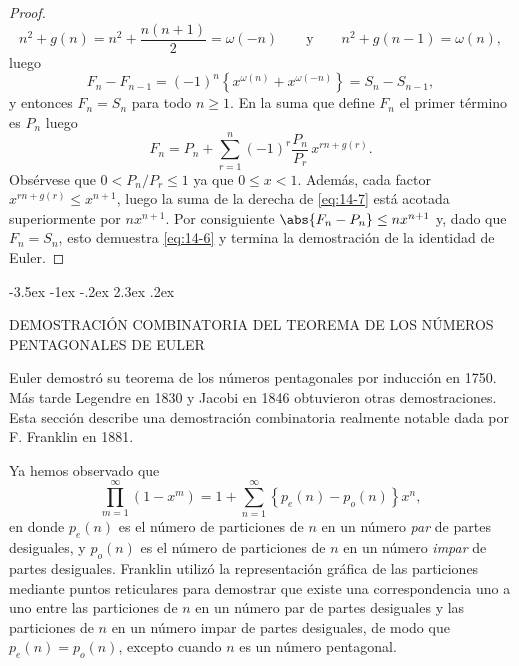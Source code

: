 \documentclass[12pt,a4paper]{book}
\makeatletter
\renewcommand\section{\@startsection{section}{1}{\z@}%
  {-3.5ex \@plus -1ex \@minus -.2ex}%
  {2.3ex \@plus .2ex}%
  {\normalfont\Large\bfseries\raggedright}}
\makeatother
\begin{document}
\begin{proof}
\begin{equation*}
            n^{2}+g(n)=n^{2}+\frac{n(n+1)}{2}=\omega(-n)\qquad\text{y}\qquad n^{2}+g(n-1)=\omega(n),
        \end{equation*}
        luego
        \begin{equation*}
            F_{n}-F_{n-1}=(-1)^{n}\left\{x^{\omega(n)}+x^{\omega(-n)}\right\}=S_{n}-S_{n-1},
        \end{equation*}
        y entonces $F_{n}=S_{n}$ para todo $n\geq1$. En la suma que define $F_{n}$ el primer término
        es $P_{n}$ luego
        \begin{equation}\label{eq:14-7}
            F_{n}=P_{n}+\sum_{r=1}^{n}(-1)^{r}\frac{P_{n}}{P_{r}}\,x^{rn+g(r)}.
        \end{equation}
        Obsérvese que $0<P_{n}/P_{r}\leq1$ ya que $0\leq x<1$. Además, cada factor
        $x^{rn+g(r)}\leq x^{n+1}$, luego la suma de la derecha de \eqref{eq:14-7} está acotada
        superiormente por $nx^{n+1}$. Por consiguiente $\abs{F_{n}-P_{n}}\leq nx^{n+1}$ y, dado que
        $F_{n}=S_{n}$, esto demuestra \eqref{eq:14-6} y termina la demostración de la identidad de
        Euler.
    \end{proof}

    \section{DEMOSTRACIÓN COMBINATORIA DEL TEOREMA DE LOS NÚMEROS PENTAGONALES DE EULER}

    Euler demostró su teorema de los números pentagonales por inducción en 1750. Más tarde
    Legendre en 1830 y Jacobi en 1846 obtuvieron otras demostraciones. Esta sección describe
    una demostración combinatoria realmente notable dada por F. Franklin \cite{franklin1881} en
    1881.

    Ya hemos observado que
    \begin{equation*}
        \prod_{m=1}^{\infty}(1-x^{m})=1+\sum_{n=1}^{\infty}\left\{p_{e}(n)-p_{o}(n)\right\}x^{n},
    \end{equation*}
    en donde $p_{e}(n)$ es el número de particiones de $n$ en un número \textit{par} de partes
    desiguales, y $p_{o}(n)$ es el número de particiones de $n$ en un número \textit{impar} de
    partes desiguales. Franklin utilizó la representación gráfica de las particiones mediante
    puntos reticulares para demostrar que existe una correspondencia uno a uno entre las
    particiones de $n$ en un número par de partes desiguales y las particiones de $n$ en un
    número impar de partes desiguales, de modo que $p_{e}(n)=p_{o}(n)$, excepto cuando $n$ es un
    número pentagonal.
\end{document}
